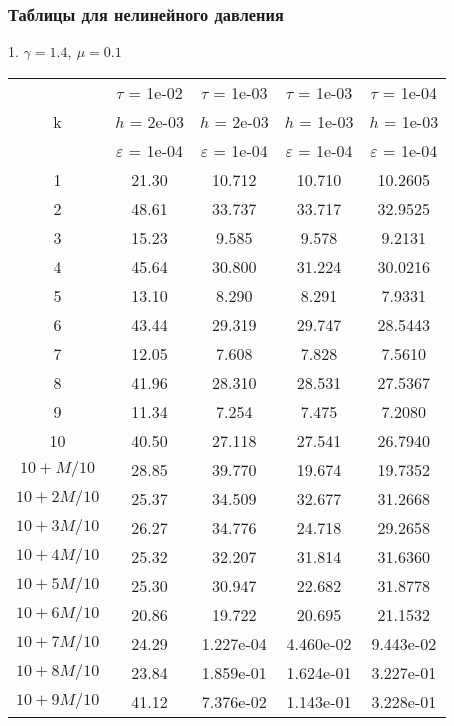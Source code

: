 \subsubsection{Таблицы для нелинейного давления}
1. $\gamma = 1.4, \ \mu = 0.1$
\begin{center}
	\begin{tabular}{ |c|c|c|c|c| } 
		\hline
		& $\tau$ = 1e-02 & $\tau$ = 1e-03 & $\tau$ = 1e-03 & $\tau$ = 1e-04 \\ 
		k & $h$ = 2e-03 & $h$ = 2e-03 & $h$ = 1e-03 & $h$ = 1e-03 \\ 
		& $\varepsilon$ = 1e-04 & $\varepsilon$ = 1e-04 & $\varepsilon$ = 1e-04 & $\varepsilon$ = 1e-04 \\ 
		\hline
		1 & 21.30 & 10.712 & 10.710 & 10.2605 \\
		\hline
		2 & 48.61 & 33.737 & 33.717 & 32.9525 \\
		\hline
		3 & 15.23 & 9.585 & 9.578 & 9.2131 \\
		\hline
		4 & 45.64 & 30.800 & 31.224 & 30.0216 \\
		\hline
		5 & 13.10 & 8.290 & 8.291 & 7.9331 \\
		\hline
		6 & 43.44 & 29.319 & 29.747 & 28.5443 \\
		\hline
		7 & 12.05 & 7.608 & 7.828 & 7.5610 \\
		\hline
		8 & 41.96 & 28.310 & 28.531 & 27.5367 \\
		\hline
		9 & 11.34 & 7.254 & 7.475 & 7.2080 \\
		\hline
		10 & 40.50 & 27.118 & 27.541 & 26.7940 \\
		\hline
		$10 + M/10$ & 28.85 & 39.770 & 19.674 & 19.7352 \\
		\hline
		$10 + 2M/10$ & 25.37 & 34.509 & 32.677 & 31.2668 \\
		\hline
		$10 + 3M/10$ & 26.27 & 34.776 & 24.718 & 29.2658 \\
		\hline
		$10 + 4M/10$ & 25.32 & 32.207 & 31.814 & 31.6360 \\
		\hline
		$10 + 5M/10$ & 25.30 & 30.947 & 22.682 & 31.8778 \\
		\hline
		$10 + 6M/10$ & 20.86 & 19.722 & 20.695 & 21.1532 \\
		\hline
		$10 + 7M/10$ & 24.29 & 1.227e-04 & 4.460e-02 & 9.443e-02 \\
		\hline
		$10 + 8M/10$ & 23.84 & 1.859e-01 & 1.624e-01 & 3.227e-01 \\
		\hline
		$10 + 9M/10$ & 41.12 & 7.376e-02 & 1.143e-01 & 3.228e-01 \\
		\hline
	\end{tabular}
\end{center}

